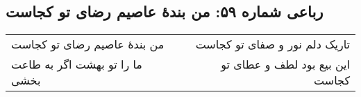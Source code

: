 \begin{center}
\section*{رباعی شماره ۵۹: من بندهٔ عاصیم رضای تو کجاست}
\label{sec:sh059}
\begin{longtable}{l p{0.5cm} r}
من بندهٔ عاصیم رضای تو کجاست
&&
تاریک دلم نور و صفای تو کجاست
\\
ما را تو بهشت اگر به طاعت بخشی
&&
این بیع بود لطف و عطای تو کجاست
\\
\end{longtable}
\end{center}
